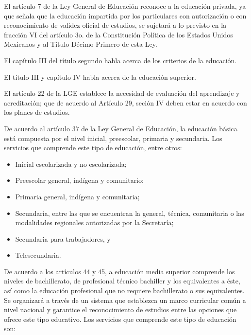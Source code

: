 \documentclass[
  12,
]{scrartcl}
\providecommand{\tightlist}{%
  \setlength{\itemsep}{0pt}\setlength{\parskip}{0pt}}
\begin{document}
\begin{enumerate}
\begin{enumerate}
    El artículo 7 de la Ley General de Educación reconoce a la educación
    privada, ya que señala que la educación impartida por los
    particulares con autorización o con reconocimiento de validez
    oficial de estudios, se sujetará a lo previsto en la fracción VI del
    artículo 3o. de la Constitución Política de los Estados Unidos
    Mexicanos y al Título Décimo Primero de esta Ley.

    El capítulo III del título segundo habla acerca de los criterios de
    la educación.

    El título III y capítulo IV habla acerca de la educación superior.

    El artículo 22 de la LGE establece la necesidad de evaluación del
    aprendizaje y acreditación; que de acuerdo al Artículo 29, seción IV
    deben estar en acuerdo con los planes de estudios.

    De acuerdo al artículo 37 de la Ley General de Educación, la
    educación básica está compuesta por el nivel inicial, preescolar,
    primaria y secundaria. Los servicios que comprende este tipo de
    educación, entre otros:

    \begin{itemize}
    \tightlist
    \item
      Inicial escolarizada y no escolarizada;
    \item
      Preescolar general, indígena y comunitario;
    \item
      Primaria general, indígena y comunitaria;
    \item
      Secundaria, entre las que se encuentran la general, técnica,
      comunitaria o las modalidades regionales autorizadas por la
      Secretaría;
    \item
      Secundaria para trabajadores, y
    \item
      Telesecundaria.
    \end{itemize}

    De acuerdo a los artículos 44 y 45, a educación media superior
    comprende los niveles de bachillerato, de profesional técnico
    bachiller y los equivalentes a éste, así como la educación
    profesional que no requiere bachillerato o sus equivalentes. Se
    organizará a través de un sistema que establezca un marco curricular
    común a nivel nacional y garantice el reconocimiento de estudios
    entre las opciones que ofrece este tipo educativo. Los servicios que
    comprende este tipo de educación son:


\end{enumerate}
\end{enumerate}
\end{document}
